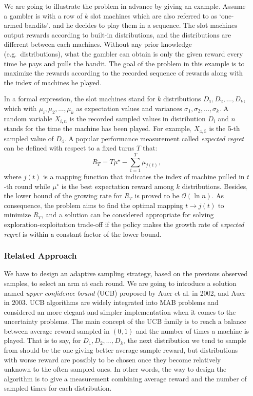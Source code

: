 We are going to illustrate the problem in advance by giving an
example.
Assume a gambler is with a row of $k$ slot machines which are
also referred to as `one-armed bandits', and he decides to play them in
a sequence.
The slot machines output rewards according to built-in distributions,
and the distributions are different between each machines.
Without any prior knowledge (e.g.\ distributions), what the gambler can
obtain is only the given reward every time he pays and pulls the bandit.
The goal of the problem in this example is to maximize the rewards
according to the recorded sequence of rewards along with the index of
machines he played.

In a formal expression, the slot machines stand for $k$ distributions
$D_1, D_2, \ldots, D_k$, which with $\mu_i,\mu_2,\ldots,\mu_k$ as
expectation values and variances $\sigma_1, \sigma_2,\ldots,\sigma_k$.
A random variable $X_{i,n}$ is the recorded sampled values in
distribution $D_i$ and $n$ stands for the time the machine has been
played.
For example, $X_{4,5}$ is the 5-th sampled value of $D_4$.
A popular performance measurement called \emph{expected regret} can be
defined with respect to a fixed turns $T$ that: \[R_T = T\mu^\star -
\sum\limits_{t=1}^T \mu_{j(t)},\] where $j(t)$ is a mapping function
that indicates the index of machine pulled in $t$-th round while
$\mu^\star$ is the best expectation reward among $k$ distributions.
Besides, the lower bound of the growing rate for $R_T$ is proved to be
$\mathcal{O}(\ln{n})$.
As consequence, the problem aims to find the optimal mapping $t
\rightarrow j(t)$ to minimize $R_T$, and a solution can be considered
appropriate for solving exploration-exploitation trade-off if the policy
makes the growth rate of \emph{expected regret} is within a constant
factor of the lower bound.

\subsubsection{Related Approach}

We have to design an adaptive sampling strategy, based on the previous
observed samples, to select an arm at each round.
We are going to introduce a solution named \emph{upper confidence bound}
(UCB) proposed by Auer et al. in 2002, and Auer in 2003.
UCB algorithms are widely integrated into MAB problems and considered an
more elegant and simpler implementation when it comes to the uncertainty
problems.
The main concept of the UCB family is to reach a balance between average
reward sampled in $(0,1)$ and the number of times a machine is played.
That is to say, for $D_1, D_2, \ldots, D_k$, the next distribution we
tend to sample from should be the one giving better average sample
reward, but distributions with worse reward are possibly to be chosen
once they become relatively unknown to the often sampled ones.
In other words, the way to design the algorithm is to give a measurement
combining average reward and the number of sampled times for each
distribution. 

